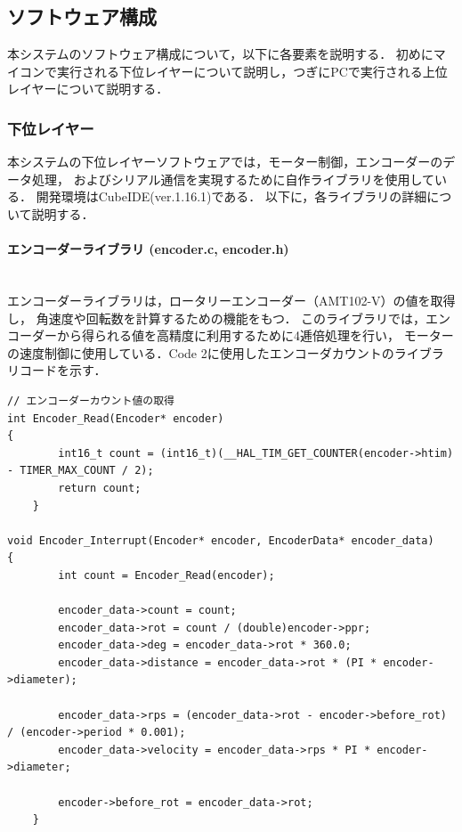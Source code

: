 
\subsection{ソフトウェア構成}
本システムのソフトウェア構成について，以下に各要素を説明する．
初めにマイコンで実行される下位レイヤーについて説明し，つぎにPCで実行される上位レイヤーについて説明する．

\subsubsection{下位レイヤー}
本システムの下位レイヤーソフトウェアでは，モーター制御，エンコーダーのデータ処理，
およびシリアル通信を実現するために自作ライブラリを使用している．
開発環境はCubeIDE(ver.1.16.1)である．
以下に，各ライブラリの詳細について説明する．

\paragraph{エンコーダーライブラリ (encoder.c, encoder.h)}\mbox{}\\
エンコーダーライブラリは，ロータリーエンコーダー（AMT102-V）の値を取得し，
角速度や回転数を計算するための機能をもつ．
このライブラリでは，エンコーダーから得られる値を高精度に利用するために4逓倍処理を行い，
モーターの速度制御に使用している．Code 2に使用したエンコーダカウントのライブラリコードを示す．


\begin{lstlisting}
// エンコーダーカウント値の取得
int Encoder_Read(Encoder* encoder)
{
        int16_t count = (int16_t)(__HAL_TIM_GET_COUNTER(encoder->htim) - TIMER_MAX_COUNT / 2);
        return count;
    }

void Encoder_Interrupt(Encoder* encoder, EncoderData* encoder_data)
{
        int count = Encoder_Read(encoder);

        encoder_data->count = count;
        encoder_data->rot = count / (double)encoder->ppr;
        encoder_data->deg = encoder_data->rot * 360.0;
        encoder_data->distance = encoder_data->rot * (PI * encoder->diameter);

        encoder_data->rps = (encoder_data->rot - encoder->before_rot) / (encoder->period * 0.001);
        encoder_data->velocity = encoder_data->rps * PI * encoder->diameter;

        encoder->before_rot = encoder_data->rot;
    }
\end{lstlisting}

